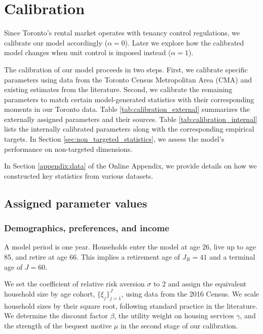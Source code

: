 \documentclass[parskip=full]{article}
\begin{document}
\section{Calibration}\label{sec:calibration}

Since Toronto's rental market operates with tenancy control regulations, we calibrate our model accordingly ($\alpha=0$). Later we explore how the calibrated model changes when unit control is imposed instead ($\alpha=1$).

The calibration of our model proceeds in two steps. First, we calibrate specific parameters using data from the Toronto Census Metropolitan Area (CMA) and existing estimates from the literature. Second, we calibrate the remaining parameters to match certain model-generated statistics with their corresponding moments in our Toronto data. Table \ref{tab:calibration_external} summarizes the externally assigned parameters and their sources. Table \ref{tab:calibration_internal} lists the internally calibrated parameters along with the corresponding empirical targets. In Section \ref{sec:non_targeted_statistics}, we assess the model's performance on non-targeted dimensions.

In Section \ref{appendix:data} of the Online Appendix, we provide details on how we constructed key statistics from various datasets. 

\subsection{Assigned parameter values}\label{sec:external_calibration}

\subsubsection{Demographics, preferences, and income}
A model period is one year. Households enter the model at age 26, live up to age 85, and retire at age 66. This implies a retirement age of $J_{R}=41$ and a terminal age of $J=60$. 

We set the coefficient of relative risk aversion $\sigma$ to 2 and assign the equivalent household size by age cohort, $\{\xi_{j}\}_{j=1}^{J}$, using data from the 2016 Census. We scale household sizes by their square root, following standard practice in the literature. We determine the discount factor $\beta$, the utility weight on housing services $\gamma$, and the strength of the bequest motive $\mu$ in the second stage of our calibration.
\end{document}
